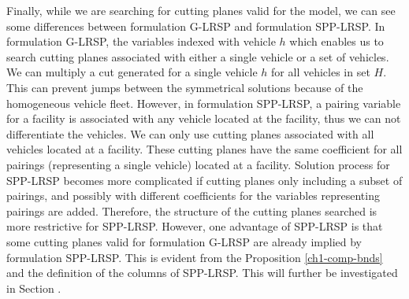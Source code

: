 Finally, while we are searching for cutting planes valid for the model, 
we can see some differences between formulation G-LRSP and formulation 
SPP-LRSP. In formulation G-LRSP, the variables indexed with vehicle 
$h$ which enables us to search cutting planes associated with either a single 
vehicle or a set of vehicles. We can multiply a cut generated for 
a single vehicle $h$ for all vehicles in set $H$. This can prevent jumps between 
the symmetrical solutions because of the homogeneous vehicle fleet. 
However, in formulation SPP-LRSP, a pairing variable for a facility
is associated with any vehicle located at the facility, thus we can
not differentiate the vehicles. We can only use cutting planes 
associated with all vehicles located at a facility. These cutting
planes have the same coefficient for all pairings (representing
a single vehicle) located at a facility. 
Solution process for SPP-LRSP becomes more complicated if cutting
planes only including a subset of pairings, and possibly with 
different coefficients for the variables representing pairings
are added. Therefore, the structure of the cutting planes searched 
is more restrictive for SPP-LRSP. However, one advantage
of SPP-LRSP is that some cutting planes valid for formulation G-LRSP
are already implied by formulation  SPP-LRSP. This is evident from
the Proposition  \ref{ch1-comp-bnds} and the definition 
of the columns of SPP-LRSP. This will further be investigated in 
Section .



   












